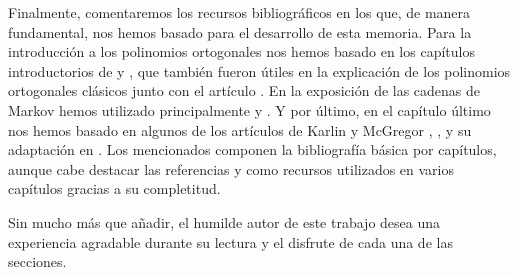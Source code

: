 Finalmente, comentaremos los recursos bibliográficos en los que, de manera fundamental, nos hemos basado para el desarrollo de esta memoria. Para la introducción a los polinomios ortogonales nos hemos basado en los capítulos introductorios de \cite{renato} y \cite{chihara}, que también fueron útiles en la explicación de los polinomios ortogonales clásicos junto con el artículo  \cite{Marcellán1994}. En la exposición de las cadenas de Markov hemos utilizado principalmente \cite{kulkarni-2012} y \cite{Ross}. Y por último, en el capítulo último nos hemos basado en algunos de los artículos de Karlin y McGregor \cite{differential-equations}, \cite{Linear-Growth}, \cite{random-walks} y su adaptación en \cite{Manuel}. Los mencionados componen la bibliografía básica por capítulos, aunque cabe destacar las referencias \cite{abramowitz-stegun} y \cite{szego} como recursos utilizados en varios capítulos gracias a su completitud.

Sin mucho más que añadir, el humilde autor de este trabajo desea una experiencia agradable durante su lectura y el disfrute de cada una de las secciones.
